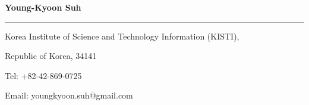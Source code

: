 \documentclass{letter} %
\begin{document}
\signature{Young-Kyoon Suh}           %
\longindentation=0pt                       %
\let\raggedleft\raggedright                %
 
\begin{letter}{
%
}

\begin{flushleft}
{\large\bf Young-Kyoon Suh}
\end{flushleft}
\medskip\hrule height 1pt
\begin{flushright}
\end{flushright}
\vspace{-.15in}
\begin{flushright}
\hfill Korea Institute of Science and Technology Information (KISTI), 
\end{flushright}
\vspace{-.15in}
\begin{flushright}
\hfill Republic of Korea, 34141
\end{flushright}
\vspace{-.15in}
\begin{flushright}
\hfill Tel: +82-42-869-0725
\end{flushright}
\vspace{-.15in}
\begin{flushright}
\hfill Email: youngkyoon.suh@gmail.com
\end{flushright} 


\end{letter}
\end{document}

